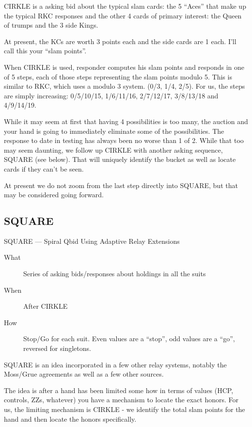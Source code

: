 \documentclass[tom-ari]{subfile}
\begin{document}
CIRKLE is a asking bid about the typical slam cards:  the 5 ``Aces'' that make up the typical RKC responses and the other 4 cards of primary interest:  the Queen of trumps and the 3 side Kings.

At present, the KCs are worth 3 points each and the side cards are 1 each.  I'll call this your ``slam points''.

When CIRKLE is used, responder computes his slam points and responds in one of 5 steps, each of those steps representing the slam points modulo 5. This is similar to RKC, which uses a modulo 3 system.  (0/3, 1/4, 2/5).  For us, the steps are simply increasing:  0/5/10/15, 1/6/11/16, 2/7/12/17, 3/8/13/18 and 4/9/14/19.

While it may seem at first that having 4 possibilities is too many, the auction and your hand is going to immediately eliminate some of the possibilities.  The response to date in testing has always been no worse than 1 of 2.  While that too may seem daunting, we follow up CIRKLE with another asking sequence, SQUARE (see below).  That will uniquely identify the bucket as well as locate cards if they can't be seen.

At present we do not zoom from the last step directly into SQUARE, but that may be considered going forward.

\subsection{SQUARE}

SQUARE --- Spiral Qbid Using Adaptive Relay Extensions

\normalsize


\begin{description}
	\item[What] Series of asking bids/responses about holdings in all the suits
	\item[When] After CIRKLE
	\item[How] Stop/Go for each suit.  Even values are a ``stop'', odd values are a ``go'', reversed for singletons.  
\end{description}

SQUARE is an idea incorporated in a few other relay systems, notably the Moss/Grue agreements as well as a few other sources. 

The idea is after a hand has been limited some how in terms of values (HCP, controls, ZZs, whatever) you have a mechanism to locate the exact honors.  For us, the limiting mechanism is CIRKLE - we identify the total slam points for the hand and then locate the honors specifically.
\end{document}
